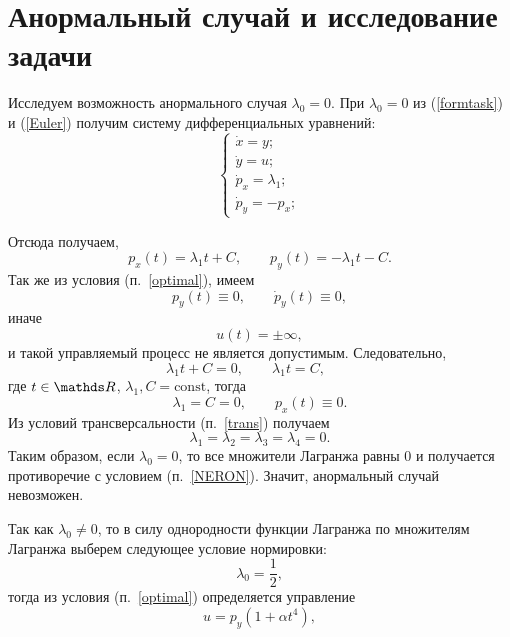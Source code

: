 \section{Анормальный случай и исследование задачи}
Исследуем возможность анормального случая $\lambda_0 = 0$. При  $\lambda_0 = 0$ из (\ref{formtask}) и (\ref{Euler}) получим систему дифференциальных уравнений:
\begin{equation}
	\begin{cases}
	\dot{x} = y;\\
	\dot{y} = u;\\
	\dot{p}_x = \lambda_1;\\
	\dot{p}_y = -p_x;
	\end{cases}
\end{equation}

Отсюда получаем, 
\[
p_x(t) = \lambda_1 t + C, \qquad p_y(t) = - \lambda_1 t - C. 
\]
Так же из условия (п.~\ref{optimal}), имеем 
\[
p_y(t) \equiv 0, \qquad
\dot{p}_y(t) \equiv 0,
\] 
иначе 
\[
u(t) = \pm \infty,
\] 
и такой управляемый процесс не является допустимым. Следовательно, 
\[
\lambda_1 t + C = 0,\qquad
\lambda_1 t = C, \qquad 
\]
где $t \in \R$, $\lambda_1, C = \mathrm{const}$, тогда
\[
\lambda_1 = C = 0, \qquad
p_x(t) \equiv 0.
\]
Из условий трансверсальности (п.~\ref{trans}) получаем 
\[
\lambda_1 = \lambda_2 = \lambda_3 = \lambda_4 = 0. 
\]
Таким образом, если $\lambda_0 = 0$, то все множители Лагранжа равны $0$ и получается противоречие с условием (п.~\ref{NERON}). Значит, анормальный случай невозможен.

Так как $\lambda_0 \not= 0$, то в силу однородности функции Лагранжа по множителям Лагранжа выберем следующее условие нормировки:
\[
\lambda_0 = \frac{1}{2},
\]
тогда из условия (п.~\ref{optimal}) определяется управление
\begin{equation}
u = p_y (1 + \alpha t^4), 
\end{equation}
